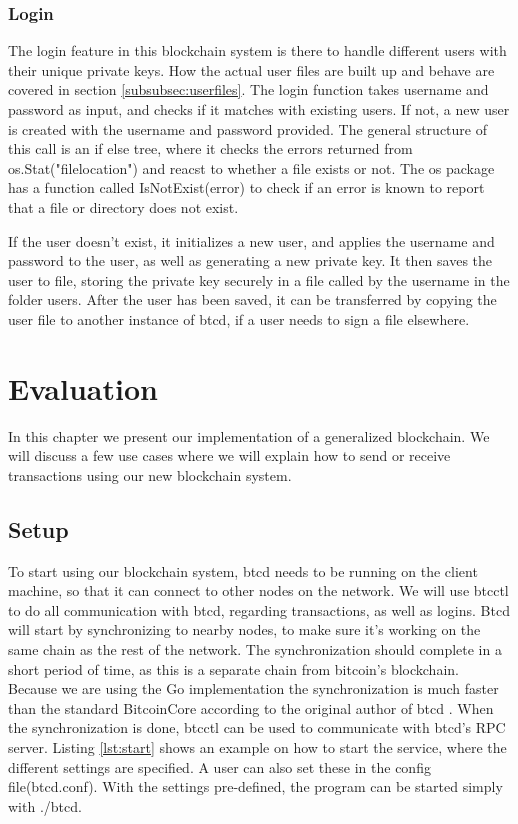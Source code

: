 \documentclass[12pt]{article}
\begin{document}
\subsubsection{Login}

The login feature in this blockchain system is there to handle different users with their unique private keys. How the actual user files are built up and behave are covered in section \ref{subsubsec:userfiles}. The login function takes username and password as input, and checks if it matches with existing users. If not, a new user is created with the username and password provided. The general structure of this call is an if else tree, where it checks the errors returned from os.Stat("filelocation") and reacst to whether a file exists or not. The os package has a function called IsNotExist(error) to check if an error is known to report that a file or directory does not exist. 

If the user doesn't exist, it initializes a new user, and applies the username and password to the user, as well as generating a new private key. It then saves the user to file, storing the private key securely in a file called by the username in the folder users. After the user has been saved, it can be transferred by copying the user file to another instance of btcd, if a user needs to sign a file elsewhere. 

\section{Evaluation}

In this chapter we present our implementation of a generalized blockchain. We will discuss a few use cases where we will explain how to send or receive transactions using our new blockchain system. 

\subsection{Setup}
To start using our blockchain system, btcd needs to be running on the client machine, so that it can connect to other nodes on the network. We will use btcctl to do all communication with btcd, regarding transactions, as well as logins. Btcd will start by synchronizing to nearby nodes, to make sure it's working on the same chain as the rest of the network. The synchronization should complete in a short period of time, as this is a separate chain from bitcoin's blockchain. Because we are using the Go implementation the synchronization is much faster than the standard BitcoinCore according to the original author of btcd \cite{davec}. When the synchronization is done, btcctl can be used to communicate with btcd's RPC server. Listing \ref{lst:start} shows an example on how to start the service, where the different settings are specified. A user can also set these in the config file(btcd.conf). With the settings pre-defined, the program can be started simply with ./btcd.
\end{document}
